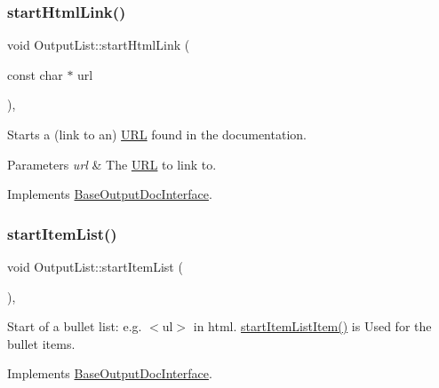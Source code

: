 \mbox{\label{class_output_list_acfe3869e533af42c1446e2fc91a37e5e}} 
\subsubsection{\texorpdfstring{startHtmlLink()}{startHtmlLink()}}
{\footnotesize\ttfamily void Output\+List\+::start\+Html\+Link (\begin{DoxyParamCaption}\item[{const char $\ast$}]{url }\end{DoxyParamCaption})\hspace{0.3cm}{\ttfamily [inline]}, {\ttfamily [virtual]}}

Starts a (link to an) \mbox{\hyperlink{struct_u_r_l}{U\+RL}} found in the documentation. 
\begin{DoxyParams}{Parameters}
{\em url} & The \mbox{\hyperlink{struct_u_r_l}{U\+RL}} to link to. \\
\hline
\end{DoxyParams}


Implements \mbox{\hyperlink{class_base_output_doc_interface_ab52dbf41ce337c701f9cd1e7794f80e7}{Base\+Output\+Doc\+Interface}}.

\mbox{\label{class_output_list_a1677b65eb8f01a10b1d767758338a212}} 
\subsubsection{\texorpdfstring{startItemList()}{startItemList()}}
{\footnotesize\ttfamily void Output\+List\+::start\+Item\+List (\begin{DoxyParamCaption}{ }\end{DoxyParamCaption})\hspace{0.3cm}{\ttfamily [inline]}, {\ttfamily [virtual]}}

Start of a bullet list\+: e.\+g. {\ttfamily $<$ul$>$} in html. \mbox{\hyperlink{class_output_list_a77e30e9a84b48907b886e8231dbbc20b}{start\+Item\+List\+Item()}} is Used for the bullet items. 

Implements \mbox{\hyperlink{class_base_output_doc_interface_a54b169393594b6cf113977ccccaeb9ee}{Base\+Output\+Doc\+Interface}}.

